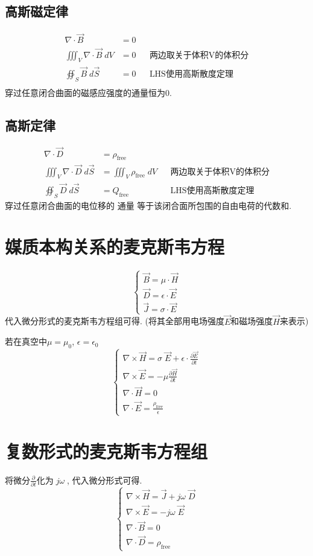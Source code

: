 \documentclass[a4paper]{report}
\begin{document}
\subsection{高斯磁定律}
\begin{align*}
    \nabla\cdot \vec{B} &=0\\
    \iiint_V \nabla\cdot \vec{B} \;dV &=0 &&\text{两边取关于体积V的体积分}\\
    \oiint_S \vec{B} \; d\vec{S}&=0 &&\text{LHS使用高斯散度定理}\\
\end{align*}
穿过任意闭合曲面的磁感应强度的通量恒为0. 
\subsection{高斯定律}
\begin{align*}
    \nabla\cdot \vec{D} &= \rho_{\text{free}}\\
    \iiint_V \nabla\cdot \vec{D} \; d\vec{S}&=\iiint_V \rho_{\text{free}} \; dV&&\text{两边取关于体积V的体积分}\\
    \oiint_S \vec{D} \; d\vec{S}&=Q_{\text{free}} &&\text{LHS使用高斯散度定理}
\end{align*}
穿过任意闭合曲面的电位移的 通量 等于该闭合面所包围的自由电荷的代数和. 
\section{媒质本构关系的麦克斯韦方程}
$$
\begin{cases}
    \vec{B}=\mu \cdot \vec{H}\\
    \vec{D}=\epsilon \cdot \vec{E}\\
    \vec{J}=\sigma\cdot \vec{E} 
\end{cases}
$$
代入微分形式的麦克斯韦方程组可得. (将其全部用电场强度$\vec{E}$和磁场强度$\vec{H}$来表示) \par
若在真空中$\mu=\mu_0$, $\epsilon=\epsilon_0$
$$
\begin{cases}
    \nabla\times \vec{H} = \sigma\;\vec{E} + \epsilon\cdot \frac{\partial \vec{E} }{\partial t}\\
    \nabla\times \vec{E} =-\mu \frac{\partial \vec{H} }{\partial t}\\
    \nabla\cdot \vec{H} =0\\
    \nabla\cdot \vec{E} = \frac{\rho_{\text{free}}}{\epsilon}
\end{cases}
$$
\section{复数形式的麦克斯韦方程组}
将微分$\frac{\partial }{\partial t}$化为$\;j\omega \;$, 代入微分形式可得. 
$$
\begin{cases}
    \nabla\times \vec{H} =\vec{J}+j\omega \;\vec{D} \\
    \nabla\times \vec{E} =-j\omega \;\vec{E} \\
    \nabla\cdot \vec{B} =0\\
    \nabla\cdot \vec{D} =\rho_{\text{free}}
\end{cases}
$$
\end{document}
